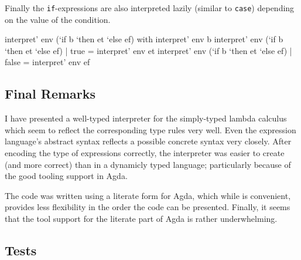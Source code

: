 \documentclass{article}
\begin{document}
Finally the \texttt{if}-expressions are also interpreted lazily (similar to \texttt{case}) depending on the value of the condition.

\begin{code}
           interpret' env (`if b `then et `else ef) with interpret' env b
           interpret' env (`if b `then et `else ef) | true = interpret' env et
           interpret' env (`if b `then et `else ef) | false = interpret' env ef
\end{code}

\subsection{Final Remarks}
\label{sub:FinalRemarks}
I have presented a well-typed interpreter for the simply-typed lambda calculus which seem to reflect the corresponding type rules very well. Even the expression language's 
abstract syntax reflects a possible concrete syntax very closely.
After encoding the type of expressions correctly, the interpreter was easier to create (and more correct) than in a dynamicly typed language; particularly because of the good tooling support in Agda.

The code was written using a literate form for Agda, which while is convenient, provides less flexibility in the order the code can be presented.
Finally, it seems that the tool support for the literate part of Agda is rather underwhelming.


\subsection{Tests}
\label{sub:Tests}
\end{document}
